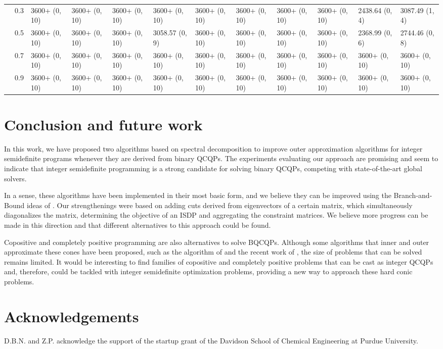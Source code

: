 \documentclass{article}
\begin{document}
\begin{table}
{\begin{tabular}{llllllllllll}
 & 0.3 & 3600+ (0, 10) & 3600+ (0, 10) & 3600+ (0, 10) & 3600+ (0, 10) & 3600+ (0, 10) & 3600+ (0, 10) & 3600+ (0, 10) & 3600+ (0, 10) & 2438.64 (0, 4) & 3087.49 (1, 4) \\
 & 0.5 & 3600+ (0, 10) & 3600+ (0, 10) & 3600+ (0, 10) & 3058.57 (0, 9) & 3600+ (0, 10) & 3600+ (0, 10) & 3600+ (0, 10) & 3600+ (0, 10) & 2368.99 (0, 6) & 2744.46 (0, 8) \\
 & 0.7 & 3600+ (0, 10) & 3600+ (0, 10) & 3600+ (0, 10) & 3600+ (0, 10) & 3600+ (0, 10) & 3600+ (0, 10) & 3600+ (0, 10) & 3600+ (0, 10) & 3600+ (0, 10) & 3600+ (0, 10) \\
 & 0.9 & 3600+ (0, 10) & 3600+ (0, 10) & 3600+ (0, 10) & 3600+ (0, 10) & 3600+ (0, 10) & 3600+ (0, 10) & 3600+ (0, 10) & 3600+ (0, 10) & 3600+ (0, 10) & 3600+ (0, 10) \\
\cline{1-12}
\bottomrule
\end{tabular}}
\end{table}


\section{Conclusion and future work}\label{oa_sec:6}

In this work, we have proposed two algorithms based on spectral decomposition to improve outer approximation algorithms for integer semidefinite programs whenever they are derived from binary QCQPs. The experiments evaluating our approach are promising and seem to indicate that integer semidefinite programming is a strong candidate for solving binary QCQPs, competing with state-of-the-art global solvers.

In a sense, these algorithms have been implemented in their most basic form, and we believe they can be improved using the Branch-and-Bound ideas of \citet{coey2020outer}. 
Our strengthenings were based on adding cuts derived from eigenvectors of a certain matrix, which simultaneously diagonalizes the matrix, determining the objective of an ISDP and aggregating the constraint matrices. We believe more progress can be made in this direction and that different alternatives to this approach could be found. 

Copositive and completely positive programming are also alternatives to solve BQCQPs. Although some algorithms that inner and outer approximate these cones have been proposed, such as the algorithm of \citet{bundfuss2009adaptive} 
and the recent work of \citet{gouveia2020inner}, the size of problems that can be solved remains limited. It would be interesting to find families of copositive and completely positive problems that can be cast as integer QCQPs and, therefore, could be tackled with integer semidefinite optimization problems, providing a new way to approach these hard conic problems.

\section*{Acknowledgements}
D.B.N. and Z.P. acknowledge the support of the startup grant of the Davidson School of Chemical Engineering at Purdue University.



 
\end{document}
